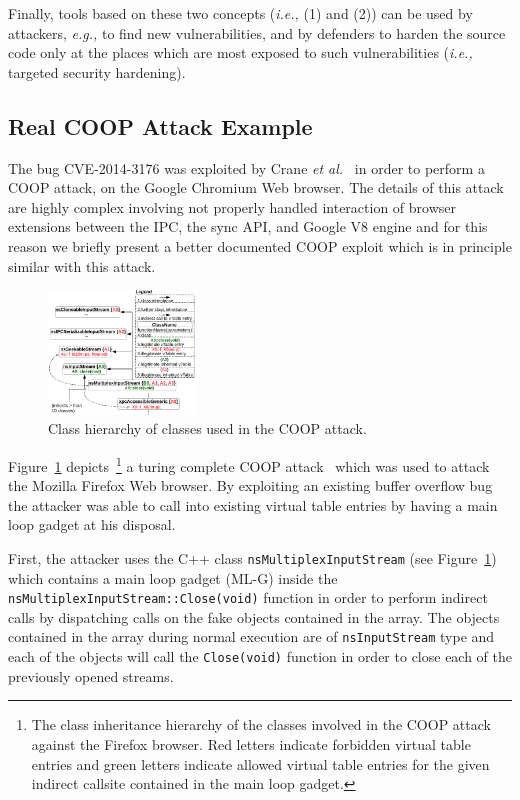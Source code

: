 Finally, tools based on these two concepts (\textit{i.e.,} (1) and (2)) can be used by attackers, \textit{e.g.,} to find new vulnerabilities, and by defenders
to harden the source code only at the places which are most exposed to such vulnerabilities (\textit{i.e.,} targeted security hardening).

\subsection{Real COOP Attack Example}
\label{Real COOP Attack Example}
The bug CVE-2014-3176 was exploited by Crane \textit{et al.}~\cite{crane:readactor++} in order to perform a
COOP attack, on the Google Chromium Web browser. The details of this attack are highly complex involving not properly 
handled interaction of browser extensions between the IPC, the sync API, and Google V8 engine and for this reason we briefly present a better
documented COOP exploit which is in principle similar with this attack.

\label{Running Example: CVE X}
\begin{figure}[h!]
    \centering
    \includegraphics[width=0.35\textwidth]{figures/class_hierarchy.pdf}
\caption{Class hierarchy of classes used in the COOP attack.}
\label{Class exploit}
\vspace{-.29cm}
\end{figure}
Figure~\ref{Class exploit} depicts~\footnote{The class inheritance hierarchy of the classes involved in the COOP attack against the Firefox browser. Red letters 
indicate forbidden virtual table entries and green letters indicate allowed virtual table entries for the given indirect callsite
contained in the main loop gadget.} a turing complete COOP attack~\cite{schuster:coop} which was used to attack the Mozilla Firefox Web browser. 
By exploiting an existing buffer overflow bug the attacker was able to call into existing virtual table entries by having a main loop gadget at his disposal.

First, the attacker uses the C++ class \texttt{nsMultiplexInputStream} (see Figure~\ref{Class exploit}) which contains a 
main loop gadget (ML-G) inside the \texttt{nsMultiplexInputStream::Close(void)} 
function in order to perform indirect calls by dispatching calls on the fake objects contained in the array. The objects 
contained in the array during normal execution are of \texttt{nsInputStream} type and each of the objects will call the 
\texttt{Close(void)} function in order to close each of the previously opened streams. 

